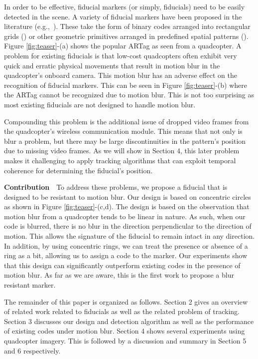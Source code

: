 \documentclass[10pt,twocolumn,letterpaper]{article}
\begin{document}
In order to be effective, fiducial markers (or simply, fiducials) need
to be easily detected in the scene. A variety of fiducial markers
have been proposed in the literature
(e.g.,~\cite{NaimarkF02,ARToolkit02,Fiala05,Pitag13,runetag11}).
These take the form of binary codes arranged into rectangular grids (\cite{ARToolkit02,Fiala05})
or other geometric primitives arranged in predefined spatial patterns
(\cite{NaimarkF02,Pitag13,runetag11}).
Figure \ref{fig:teaser}-(a) shows the popular ARTag \cite{Fiala05} as
seen from a quadcopter. A problem for existing fiducials is that low-cost quadcopters
often exhibit very quick and erratic physical movements that
result in motion blur in the quadcopter's onboard camera. This motion blur has
an adverse effect on the recognition of fiducial markers. This can be seen in
Figure \ref{fig:teaser}-(b) where the ARTag cannot be recognized due to motion
blur. This is not too surprising as most existing fiducials are not
designed to handle motion blur.

Compounding this problem is the additional issue of dropped video frames from
the quadcopter's wireless communication module. This means that not only is
blur a problem, but there may be large discontinuities in the pattern's
position due to missing video frames. As we will show in Section 4, this later problem
makes it challenging to apply tracking algorithms that can exploit temporal
coherence for determining the fiducial's position.

\noindent\textbf{Contribution}~~To address these problems, we propose a
fiducial that is designed to be resistant to motion blur. Our design is based on
concentric circles as shown in Figure \ref{fig:teaser}-(c,d). The design is based
on the observation that motion blur from a quadcopter tends to be linear in
nature. As such, when our code is blurred, there is no blur in the direction
perpendicular to the direction of motion.  This allows the signature of the
fiducial to remain intact in any direction. In addition, by using concentric
rings, we can treat the presence or absence of a ring as a bit, allowing us to
assign a code to the marker. Our experiments show that this design can
significantly outperform existing codes in the presence of motion blur. As far
as we are aware, this is the first work to propose a blur resistant marker.

The remainder of this paper is organized as follows.  Section 2 gives an
overview of related work related to fiducials as well as the related problem of
tracking. Section 3 discusses our design and detection algorithm as well as
the performance of existing codes under motion blur. Section 4 shows several
experiments using quadcopter imagery. This is followed by a discussion and
summary in Section 5 and 6 respectively.
\end{document}
